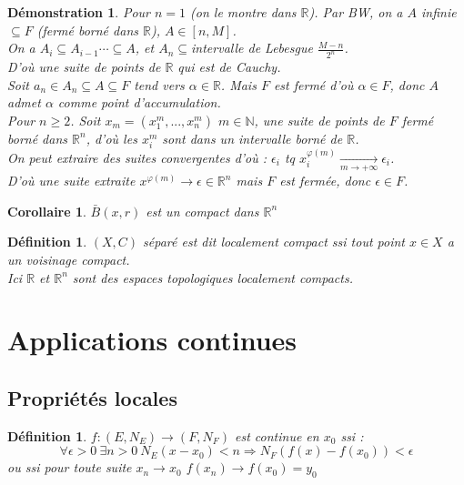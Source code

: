 \documentclass[a4paper, oneside]{report}
\theoremstyle{break}
\newtheorem{defi}[thm]{Définition}
\newtheorem{cor}[thm]{Corollaire}
\newtheorem*{demo}{Démonstration}
\newcommand{\R}{\mathbb{R}}
\newcommand{\N}{\mathbb{N}}
\begin{document}
\begin{demo}
Pour $n=1$ (on le montre dans $\R$). Par BW, on a $A$ infinie $\subseteq F$ (fermé borné dans $\R$), $A\in [n,M]$.\\
On a $A_i\subseteq A_{i-1}\cdots \subseteq A$, et $A_n \subseteq $intervalle de Lebesgue $\frac{M-n}{2^n}$.\\
D'où une suite de points de $\R$ qui est de Cauchy.\\
Soit $a_n\in A_n\subseteq A \subseteq F$ tend vers $\alpha \in \R$. Mais $F$ est fermé d'où $\alpha \in F$, donc $A$ admet $\alpha$ comme point d'accumulation.\\

Pour $n\geq 2$. Soit $x_m = (x_1^m,...,x_n^m)$ $m\in \N$, une suite de points de $F$ fermé borné dans $\R^n$, d'où les $x_i^m$ sont dans un intervalle borné de $\R$.\\
On peut extraire des suites convergentes d'où : $\epsilon_i$ tq $x_i^{\varphi(m)}\underset{m \rightarrow +\infty}{\rightarrow }\epsilon_i$.\\
D'où une suite extraite $x^{\varphi(m)}\rightarrow \epsilon \in \R^n$ mais $F$ est fermée, donc $\epsilon \in F$.\end{demo}


\begin{cor}
$\bar{B}(x,r)$ est un compact dans $\R^n$
\end{cor}


\begin{defi}
$(X,C)$ séparé est dit localement compact ssi tout point $x\in X$ a un voisinage compact.\\
Ici $\R$ et $\R^n$ sont des espaces topologiques localement compacts.
\end{defi}


\section{Applications continues}

\subsection{Propriétés locales}

\begin{defi}
$f:(E,N_E)\rightarrow (F,N_F)$ est continue en $x_0$ ssi :
$$\forall \epsilon >0~\exists n>0~N_E(x-x_0)<n\Rightarrow N_F(f(x)-f(x_0)) < \epsilon$$
ou ssi pour toute suite $x_n\rightarrow x_0$ $f(x_n)\rightarrow f(x_0)=y_0$
\end{defi}
\end{document}
